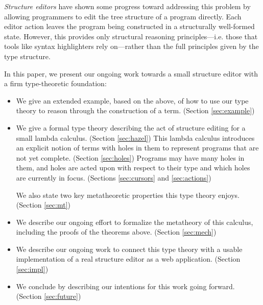 
\emph{Structure editors} have shown some progress toward addressing this
problem by allowing programmers to edit the tree structure of a program
directly. Each editor action leaves the program being constructed in a
structurally well-formed state. However, this provides only structural
reasoning principles---i.e. those that tools like syntax highlighters rely
on---rather than the full principles given by the type structure.


In this paper, we present our ongoing work towards a small structure editor
with a firm type-theoretic foundation:
\begin{itemize}
  \item We give an extended example, based on the above, of how to use our
    type theory to reason through the construction of a term. (Section
    \ref{sec:example})

  \item We give a formal type theory describing the act of structure
    editing for a small lambda calculus. (Section \ref{sec:hazel}) This
    lambda calculus introduces an explicit notion of terms with holes in
    them to represent programs that are not yet complete.
    (Section \ref{sec:holes}) Programs may have many holes in them, and
    holes are acted upon with respect to their type and which holes are
    currently in focus. (Sections \ref{sec:cursors} and \ref{sec:actions})

    We also state two key metatheoretic properties this type theory
    enjoys. (Section \ref{sec:mt})

  \item We describe our ongoing effort to formalize the metatheory of this
    calculus, including the proofs of the theorems
    above. (Section \ref{sec:mech})

  \item We describe our ongoing work to connect this type theory with a
    usable implementation of a real structure editor as a web
    application. (Section \ref{sec:impl})

  \item We conclude by describing our intentions for this work going
    forward. (Section \ref{sec:future})
\end{itemize}

